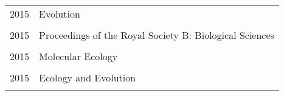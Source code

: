 \documentclass[a4paper,oneside,10pt]{article} %
\begin{document}
\subsection*{}
\begin{tabular}{p{4cm}|p{11cm}}
\hfill \textsc{2015} & Evolution\\
\multicolumn{2}{c}{} \\
\hfill \textsc{2015} & Proceedings of the Royal Society B: Biological Sciences\\
\multicolumn{2}{c}{} \\
\hfill \textsc{2015} & Molecular Ecology\\
\multicolumn{2}{c}{} \\
\hfill \textsc{2015} & Ecology and Evolution\\
\multicolumn{2}{c}{} \\
\end{tabular}
%
%
%
\end{document}
